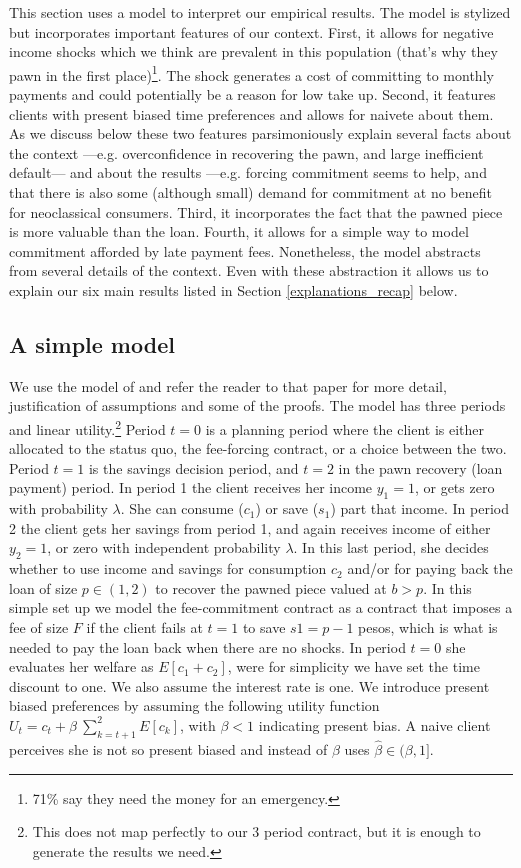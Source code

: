 \documentclass[oneside,11pt]{article}
\begin{document}
This section uses a model to interpret our empirical results. The model is stylized but incorporates important features of our context. First, it allows for negative income shocks which we think are prevalent in this population (that's why they pawn in the first place)\footnote{71\% say they need the money for an emergency.}. The shock generates a cost of committing to monthly payments and could potentially be a reason for low take up. Second, it features clients with present biased time preferences and allows for naivete about them. As we discuss below these two features parsimoniously explain several facts about the context ---e.g. overconfidence in recovering the pawn, and large inefficient default---  and about the results ---e.g. forcing commitment seems to help, and that there is also some (although small) demand for commitment at no benefit for neoclassical consumers. Third, it incorporates the fact that the pawned piece is more valuable than the loan. Fourth, it allows for a simple way to model commitment afforded by late payment fees. Nonetheless, the model abstracts from several details of the context. Even with these abstraction it allows us to explain our six main results listed in Section \ref{explanations_recap} below.


\subsection{A simple model} \label{model_detail}

We use the model of \cite{John} and refer the reader to that paper for more detail, justification of assumptions and some of the proofs. The model has three periods and linear utility.\footnote{This does not map perfectly to our 3 period contract, but it is enough to generate the results we need.} Period $t=0$ is a planning period where the client is either allocated to the status quo, the fee-forcing contract, or a choice between the two. Period $t=1$ is the savings decision period, and $t=2$ in the pawn recovery (loan payment) period. In period 1 the client receives her income $y_1=1$, or gets zero with probability $\lambda$. She can consume ($c_1$) or save ($s_1$) part that income. In period 2 the client gets her savings from period 1, and again receives income of either $y_2=1$, or zero with independent probability $\lambda$. In this last period, she decides whether to use income and savings for consumption $c_2$ and/or for paying back the loan of size $p \in(1,2)$ to recover the pawned piece valued at $b>p$. In this simple set up we model the fee-commitment contract as a contract that imposes a fee of size $F$ if the client fails at $t=1$ to save $s1=p-1$ pesos, which is what is needed to pay the loan back when there are no shocks. In period $t=0$ she evaluates her welfare as $E[c_1+c_2]$, were for simplicity we have set the time discount to one. We also assume the interest rate is one. We introduce present biased preferences by assuming the following utility function $U_t=c_t+\beta \: \sum_{k=t+1}^{2} E[c_k]$, with $\beta<1$ indicating present bias. A naive client perceives she is not so present biased and instead of $\beta$ uses $\hat{\beta} \in (\beta,1]$. 
\end{document}
